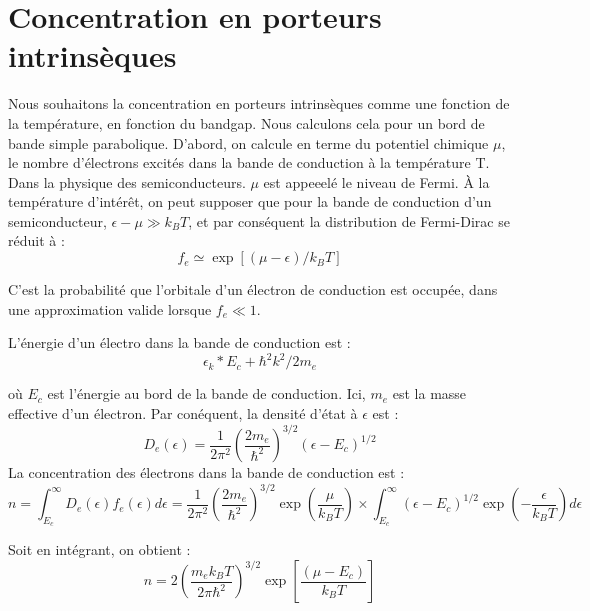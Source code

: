 \chapter{Concentration en porteurs intrinsèques}

Nous souhaitons la concentration en porteurs intrinsèques comme une fonction de
la température, en fonction du bandgap. Nous calculons cela pour un bord de bande
simple parabolique. D'abord, on calcule en terme du potentiel chimique $\mu$, le
nombre d'électrons excités dans la bande de conduction à la température T. Dans
la physique des semiconducteurs. $\mu$ est appeeelé le niveau de Fermi. À la
température d'intérêt, on peut supposer que pour la bande de conduction d'un
semiconducteur, $\epsilon - \mu \gg k_B T$, et par conséquent la distribution de
Fermi-Dirac se réduit à :
\begin{equation}
    f_e \simeq \exp[(\mu - \epsilon)/k_B T]
\end{equation}

C'est  la probabilité que l'orbitale d'un électron de conduction est occupée,
dans une approximation valide lorsque $f_e \ll 1$.

L'énergie d'un électro dans la bande de conduction est :
\begin{equation}
    \epsilon_k * E_c + \hbar^2k^2/2m_e
\end{equation}

où $E_c$ est l'énergie au bord de la bande de conduction. Ici, $m_e$ est la masse
effective d'un électron. Par conéquent, la densité d'état à $\epsilon$ est :
\begin{equation}
    D_e(\epsilon) = \frac{1}{2\pi^2}
    \left( \frac{2m_e}{\hbar^2}\right)^{3/2}(\epsilon - E_c)^{1/2}
\end{equation}
La concentration des électrons dans la bande de conduction est :
\begin{equation}
    n = \int_{E_c}^\infty D_e(\epsilon)f_e(\epsilon) d\epsilon = \frac{1}{2\pi^2}
    \left( \frac{2m_e}{\hbar^2}\right)^{3/2} \exp(\frac{\mu}{k_BT})\times
    \int_{E_c}^\infty (\epsilon - E_c)^{1/2} \exp(-\frac{\epsilon}{k_B
    T})d\epsilon
    \label{integn}
\end{equation}

Soit en intégrant, on obtient :
\begin{equation}
    n = 2 \left(\frac{m_e k_B T}{2 \pi \hbar^2}\right)^{3/2} \exp\left[\frac{(\mu
    - E_c)}{k_BT}\right]
    \label{n}
\end{equation}

